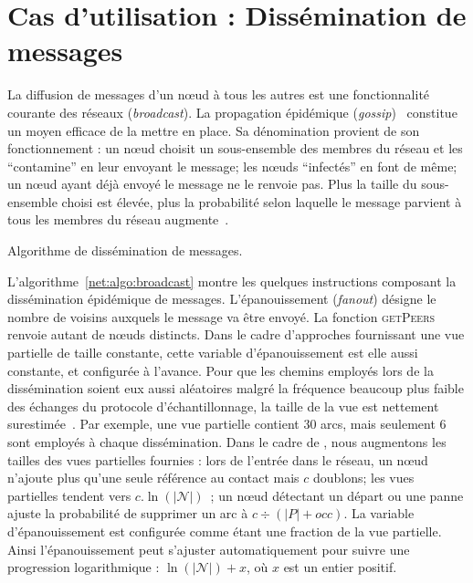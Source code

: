 
\section{Cas d'utilisation : Dissémination de messages}
\label{net:sec:usecase}

La diffusion de messages d'un nœud à tous les autres est une fonctionnalité
courante des réseaux (\emph{broadcast}). La propagation épidémique
(\emph{gossip})~\cite{birman1999bimodal} constitue un moyen efficace de la
mettre en place. Sa dénomination provient de son fonctionnement : un nœud
choisit un sous-ensemble des membres du réseau et les ``contamine'' en leur
envoyant le message; les nœuds ``infectés'' en font de même; un nœud ayant déjà
envoyé le message ne le renvoie pas. Plus la taille du sous-ensemble choisi est
élevée, plus la probabilité selon laquelle le message parvient à tous les
membres du réseau
augmente~\cite{erdos1959random}. 

\begin{algorithm}
  
  \caption[Algorithme de dissémination de
  messages]{\label{net:algo:broadcast}Algorithme de dissémination de messages.}
\end{algorithm}


L'algorithme~\ref{net:algo:broadcast} montre les quelques instructions composant
la dissémination épidémique de messages. L'épanouissement (\emph{fanout})
désigne le nombre de voisins auxquels le message va être envoyé. La fonction
\textsc{getPeers} renvoie autant de nœuds distincts. Dans le cadre d'approches
fournissant une vue partielle de taille constante, cette variable
d'épanouissement est elle aussi constante, et configurée à l'avance. Pour que
les chemins employés lors de la dissémination soient eux aussi aléatoires malgré
la fréquence beaucoup plus faible des échanges du protocole d'échantillonnage,
la taille de la vue est nettement surestimée~\cite{frey2009heterogeneous}. Par
exemple, une vue partielle contient 30 arcs, mais seulement 6 sont employés à
chaque dissémination. Dans le cadre de \SPRAY, nous augmentons les tailles des
vues partielles fournies : lors de l'entrée dans le réseau, un nœud n'ajoute
plus qu'une seule référence au contact mais $c$ doublons; les vues partielles
tendent vers $c.\ln(|\mathcal{N}|)$~\cite{ganesh2003peer}; un nœud détectant un
départ ou une panne ajuste la probabilité de supprimer un arc à
$c \div (|P|+occ)$. La variable d'épanouissement est configurée comme étant une
fraction de la vue partielle. Ainsi l'épanouissement peut s'ajuster
automatiquement pour suivre une progression logarithmique :
$\ln(|\mathcal{N}|)+x$, où $x$ est un entier positif.

